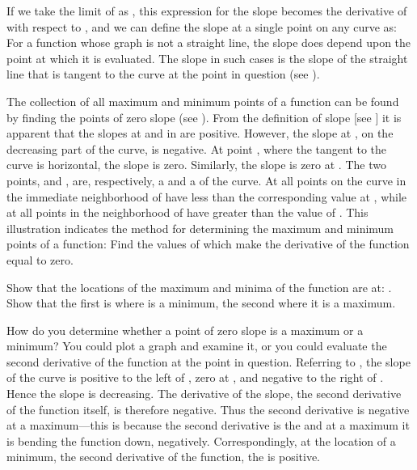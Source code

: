 {
If we take the limit of  as , this
expression for the slope
becomes the derivative of  with respect to , and we can define the
slope at a single point on any curve as:
%
%
For a function whose graph is not a straight line,
the slope does depend upon the point at which it is evaluated.
The slope in such cases is the slope of the straight line that is
tangent to the curve at the point in question (see ).

The collection of all maximum and minimum points of a
function can be found by finding the points of zero slope (see ).
From the definition of slope [see ] it is apparent that the
slopes at  and  in  are positive.
However, the slope at , on the decreasing part of the curve, is
negative.
At point , where the tangent to the curve is horizontal, the slope is
zero.
Similarly, the slope is zero at .
The two points,  and , are, respectively, a  and
a  of the curve.
At  all points on the curve in the immediate neighborhood of  have
 less than the corresponding value at , while at  all points
in the neighborhood of  have  greater than the value of .
This illustration indicates the method for determining the maximum and
minimum points of a function:
Find the values of  which make the derivative of the function equal to
zero.

\tryit Show that the locations of the maximum and minima of the function
%
%
are at:  . 
Show that the first is where  is a minimum, the second where it is a
maximum.

How do you determine whether a point of zero slope is a maximum or a
minimum?
You could plot a graph and examine it, or you could evaluate the second
derivative of the function at the point in question.
Referring to , the slope of the curve is positive to the left of
, zero at , and negative to the right of .
Hence the slope is decreasing.
The derivative of the slope, the second derivative of the function 
itself, is therefore negative.
Thus the second derivative is negative at a maximum---this is because the
second derivative is the  and at a maximum it is bending
the function down, negatively.
Correspondingly, at the location of a minimum, the second derivative of the
function, the  is positive.

}
